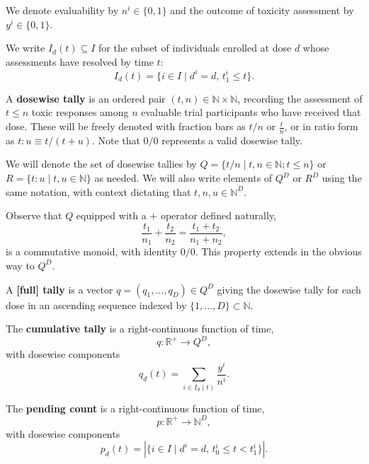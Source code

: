 \documentclass{article}
\newcommand{\N}{\mathbb{N}}
\newcommand{\R}{\mathbb{R}}
\begin{document}
\begin{nota}
  We denote evaluability by $n^i \in \{0,1\}$ and the outcome of toxicity assessment by $y^i \in \{0,1\}$.
\end{nota}

\begin{nota}
  We write $I_d(t) \subseteq I$ for the subset of individuals enrolled at dose $d$ whose assessments have resolved by time $t$:
  $$
  I_d(t) = \{ i \in I \mid d^i = d,\, t_1^i \le t \}.
  $$
\end{nota}

\begin{defn}
  A \textbf{dosewise tally} is an ordered pair $(t, n) \in \N \times \N$, recording the assessment of $t \le n$ toxic responses among $n$ evaluable trial participants who have received that dose.  These will be freely denoted with fraction bars as $t/n$ or $\frac{t}{n}$, or in ratio form as $t\!:\!u \equiv t/(t+u)$.  Note that $0/0$ represents a valid dosewise tally.
\end{defn}

\begin{nota}
  We will denote the set of dosewise tallies by $Q = \{ t/n \mid t, n \in \N; t \le n \}$ or $R = \{ t\!:\!u \mid t, u \in \N \}$ as needed.  We will also write elements of $Q^D$ or $R^D$ using the same notation, with context dictating that $t, n, u \in \N^D$.
\end{nota}

Observe that $Q$ equipped with a $+$ operator defined naturally,
$$
\frac{t_1}{n_1} + \frac{t_2}{n_2} = \frac{t_1+t_2}{n_1+n_2},
$$
is a commutative monoid, with identity $0/0$.  This property extends in the obvious way to $Q^D$.

\begin{defn}
  A \textbf{[full] tally} is a vector $q = (q_1, ..., q_D) \in Q^D$ giving the dosewise tally for each dose in an ascending sequence indexed by $\{1,...,D\} \subset \N$.
\end{defn}

\begin{defn}
  The \textbf{cumulative tally} is a right-continuous function of time,
  $$
  q : \R^+ \rightarrow Q^D,
  $$
  with dosewise components
  $$
  q_d(t) = \sum_{i \in I_d(t)} \frac{y^i}{n^i}.
  $$
\end{defn}

\begin{defn}
  The \textbf{pending count} is a right-continuous function of time,
  $$
  p : \R^+ \rightarrow \N^D,
  $$
  with dosewise components
  $$
  p_d(t) = | \{ i \in I \mid d^i = d,\, t_0^i \le t < t_1^i \} |.
  $$
\end{defn}
\end{document}
